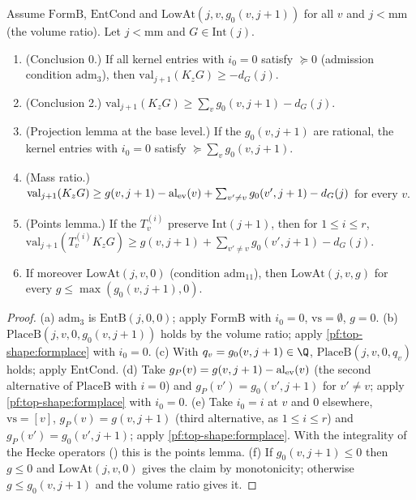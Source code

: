 \begin{proposition}\label{pf:top-shape:chainest}
Assume $\mathrm{FormB}$, $\mathrm{EntCond}$ and $\mathrm{LowAt}(j,v,g_0(v,j+1))$ for all $v$ and $j<\mathrm{mm}$ (the volume
ratio). Let $j<\mathrm{mm}$ and $G\in\mathrm{Int}(j)$.
\begin{enumerate}[label=(\alph*)]
\item (Conclusion 0.) If all kernel entries with $i_0=0$ satisfy $\succeq0$ (admission condition $\mathrm{adm}_3$), then
$\mathrm{val}_{j+1}(K_zG)\ge-d_G(j)$.
\item (Conclusion 2.) $\mathrm{val}_{j+1}(K_zG)\ge\sum_vg_0(v,j+1)-d_G(j)$.
\item (Projection lemma at the base level.) If the $g_0(v,j+1)$ are rational, the kernel entries with $i_0=0$ satisfy
$\succeq\sum_vg_0(v,j+1)$.
\item (Mass ratio.) $\mathrm{val}_{j+1}(K_zG)\ge g(v,j+1)-\mathrm{al}_{\rm ev}(v)+\sum_{v'\ne v}g_0(v',j+1)-d_G(j)$ for every $v$.
\item (Points lemma.) If the $T_v^{(i)}$ preserve $\mathrm{Int}(j+1)$, then for $1\le i\le r$,
$\mathrm{val}_{j+1}(T^{(i)}_vK_zG)\ge g(v,j+1)+\sum_{v'\ne v}g_0(v',j+1)-d_G(j)$.
\item If moreover $\mathrm{LowAt}(j,v,0)$ (condition $\mathrm{adm}_{11}$), then $\mathrm{LowAt}(j,v,g)$ for every $g\le\max(g_0(v,j+1),0)$.
\end{enumerate}
\end{proposition}

\begin{proof}
(a) $\mathrm{adm}_3$ is $\mathrm{EntB}(j,0,0)$; apply $\mathrm{FormB}$ with $i_0=0$, $\mathrm{vs}=\emptyset$, $g=0$.
(b) $\mathrm{PlaceB}(j,v,0,g_0(v,j+1))$ holds by the volume ratio; apply \cref{pf:top-shape:formplace} with $i_0=0$.
(c) With $q_v=g_0(v,j+1)\in\Q$, $\mathrm{PlaceB}(j,v,0,q_v)$ holds; apply $\mathrm{EntCond}$.
(d) Take $g_P(v)=g(v,j+1)-\mathrm{al}_{\rm ev}(v)$ (the second alternative of $\mathrm{PlaceB}$ with $i=0$) and
$g_P(v')=g_0(v',j+1)$ for $v'\ne v$; apply \cref{pf:top-shape:formplace} with $i_0=0$.
(e) Take $i_0=i$ at $v$ and $0$ elsewhere, $\mathrm{vs}=[v]$, $g_P(v)=g(v,j+1)$ (third alternative, as $1\le i\le r$) and
$g_P(v')=g_0(v',j+1)$; apply \cref{pf:top-shape:formplace}. With the integrality of the Hecke operators
() this is the points lemma.
(f) If $g_0(v,j+1)\le0$ then $g\le0$ and $\mathrm{LowAt}(j,v,0)$ gives the claim by monotonicity; otherwise $g\le g_0(v,j+1)$ and
the volume ratio gives it.
\end{proof}

